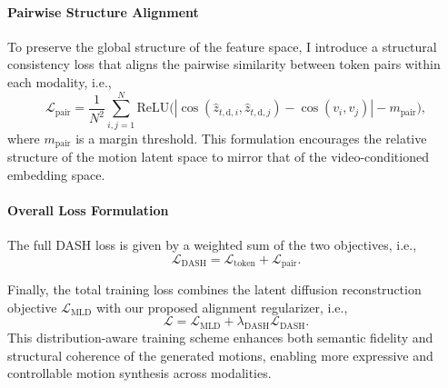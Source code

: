 \documentclass[a4paper,12pt]{article}
\begin{document}
\paragraph{Pairwise Structure Alignment}
To preserve the global structure of the feature space, I introduce a structural consistency loss that aligns the pairwise similarity between token pairs within each modality, i.e.,
\begin{equation}
\mathcal{L}_{\text{pair}} = \frac{1}{N^2}\sum_{i,j=1}^{N} \text{ReLU} \big( | \cos(\hat{z}_{t,\text{d},i}, \hat{z}_{t,\text{d},j}) - \cos(v_i, v_j) | - m_{\text{pair}} \big),
\end{equation}
where $m_{\text{pair}}$ is a margin threshold. This formulation encourages the relative structure of the motion latent space to mirror that of the video-conditioned embedding space.


\paragraph{Overall Loss Formulation}
The full DASH loss is given by a weighted sum of the two objectives, i.e.,
\begin{equation}
\mathcal{L}_{\text{DASH}} = \mathcal{L}_{\text{token}} + \mathcal{L}_{\text{pair}}.
\end{equation}


Finally, the total training loss combines the latent diffusion reconstruction objective $\mathcal{L}_{\text{MLD}}$ with our proposed alignment regularizer, i.e.,
\begin{equation}
\mathcal{L} = \mathcal{L}_{\text{MLD}} + \lambda_{\text{DASH}} \mathcal{L}_{\text{DASH}}.
\end{equation}
%
This distribution-aware training scheme enhances both semantic fidelity and structural coherence of the generated motions, enabling more expressive and controllable motion synthesis across modalities.
\end{document}
